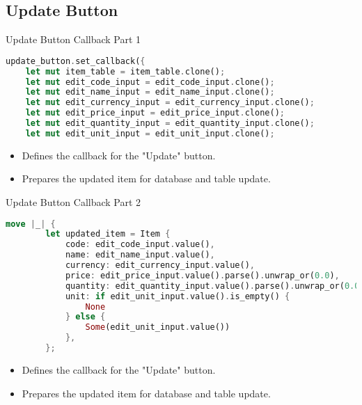 \documentclass[aspectratio=169, table]{beamer}
\begin{document}
\subsection{Update Button}
\begin{frame}[fragile]{Update Button Callback Part 1}
\vspace{15pt}
\begin{lstlisting}[language=Rust]
update_button.set_callback({
	let mut item_table = item_table.clone();
	let mut edit_code_input = edit_code_input.clone();
	let mut edit_name_input = edit_name_input.clone();
	let mut edit_currency_input = edit_currency_input.clone();
	let mut edit_price_input = edit_price_input.clone();
	let mut edit_quantity_input = edit_quantity_input.clone();
	let mut edit_unit_input = edit_unit_input.clone();
	\end{lstlisting}
	\begin{itemize}
		\item Defines the callback for the "Update" button.
		\item Prepares the updated item for database and table update.
	\end{itemize}
\end{frame}

\begin{frame}[fragile]{Update Button Callback Part 2}
\vspace{15pt}
\begin{lstlisting}[language=Rust]
	move |_| {
		let updated_item = Item {
			code: edit_code_input.value(),
			name: edit_name_input.value(),
			currency: edit_currency_input.value(),
			price: edit_price_input.value().parse().unwrap_or(0.0),
			quantity: edit_quantity_input.value().parse().unwrap_or(0.0),
			unit: if edit_unit_input.value().is_empty() {
				None
			} else {
				Some(edit_unit_input.value())
			},
		};
	\end{lstlisting}
	\begin{itemize}
		\item Defines the callback for the "Update" button.
		\item Prepares the updated item for database and table update.
	\end{itemize}
\end{frame}
	
\end{document}

